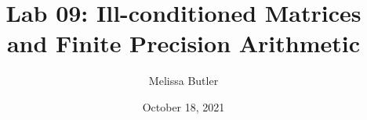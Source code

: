 \newcommand{\course}{MATH 3341}
\title{Lab 09: Ill-conditioned Matrices and Finite Precision Arithmetic}
\author{Melissa Butler}
\date{October 18, 2021}
